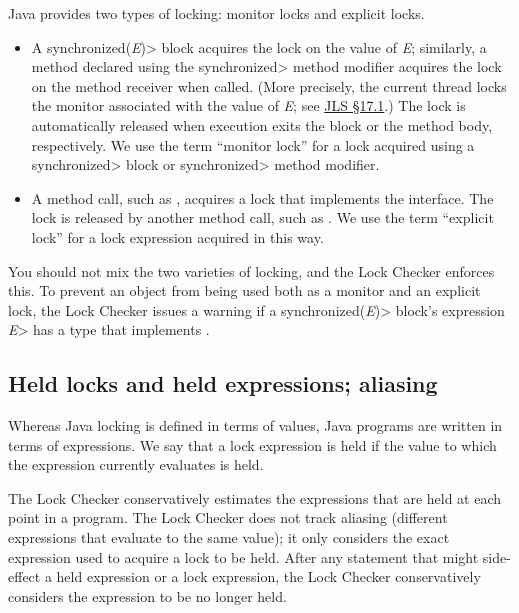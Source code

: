 Java provides two types of locking:  monitor locks and explicit locks.

\begin{itemize}
\item
  A \<synchronized(\emph{E})> block acquires the lock on the value of
  \emph{E}; similarly, a method declared using the \<synchronized> method
  modifier acquires the lock on the method receiver when called.
  (More precisely,
  the current thread locks the monitor associated with the value of
  \emph{E}; see \href{https://docs.oracle.com/javase/specs/jls/se8/html/jls-17.html#jls-17.1}{JLS \S17.1}.)
  The lock is automatically released when execution exits the block or the
  method body, respectively.
  We use the term ``monitor lock'' for a lock acquired using a
  \<synchronized>  block or \<synchronized> method modifier.
\item A method call, such as
  ,
  acquires a lock that implements the
  interface.
  The lock is released by another method call, such as
  .
  We use the term ``explicit lock'' for a lock expression acquired in this
  way.
\end{itemize}

You should not mix the two varieties of locking, and the Lock Checker
enforces this.  To prevent an object from being used both as a monitor and
an explicit lock, the Lock Checker issues a warning if a
\<synchronized(\emph{E})> block's expression \<\emph{E}> has a type that
implements .


\subsection{Held locks and held expressions; aliasing\label{lock-aliasing}}

Whereas Java locking is defined in terms of values, Java programs are
written in terms of expressions.
We say that a lock expression is held if the value to which the expression
currently evaluates is held.

The Lock Checker conservatively estimates the expressions that are held at
each point in a program.
The Lock Checker does not track aliasing
(different expressions that evaluate to the same value); it only considers
the exact expression used to acquire a lock to be held.  After any statement
that might side-effect a held expression or a lock expression, the Lock
Checker conservatively considers the expression to be no longer held.

